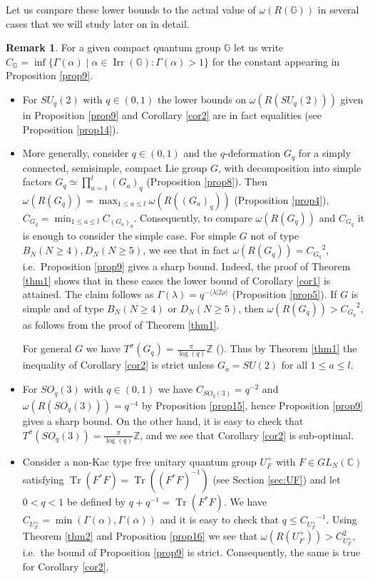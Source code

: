 \documentclass[11 pt, leqno]{amsart}
\newcommand{\ov}{\overline}
\newcommand{\la}{\langle}
\newcommand{\ra}{\rangle}
\newcommand{\CC}{\mathbb{C}}
\newcommand{\ZZ}{\mathbb{Z}}
\newcommand{\GG}{\mathbb{G}}
\DeclareMathOperator{\Irr}{Irr}
\DeclareMathOperator{\Tr}{Tr}
\theoremstyle{definition}
\newtheorem{remark}[theorem]{Remark}
\numberwithin{equation}{section}
\begin{document}
Let us compare these lower bounds to the actual value of $\omega(R(\GG))$ in several cases that we will study later on in detail.

\begin{remark}\label{rem3}
For a given compact quantum group $\GG$ let us write $C_{\GG}=\inf\{\Gamma(\alpha)\mid \alpha\in\Irr(\GG)\colon \Gamma(\alpha)>1\}$ for the constant appearing in Proposition \ref{prop9}.
\begin{itemize}
\item[(i)] For $SU_q(2)$ with $q\in (0,1)$ the lower bounds on $\omega(R(SU_q(2)))$ given in Proposition \ref{prop9} and Corollary \ref{cor2} are in fact equalities (see Proposition \ref{prop14}).
\item[(ii)] More generally, consider $q \in (0,1)$ and the $q$-deformation $G_q$ for a simply connected, semisimple, compact Lie group $G$, with decomposition into simple factors $G_q\simeq\prod_{a=1}^{l} (G_a)_q$ (Proposition \ref{prop8}). Then $\omega(R(G_q))=\max_{1\le a \le l} \omega(R((G_a)_q))$ (Proposition \ref{prop4}), $C_{G_q}=\min_{1\le a \le l} C_{(G_a)_q}$. Consequently, to compare $\omega(R(G_q))$ and $C_{G_q}$ it is enough to consider the simple case. For simple $G$ not of type $B_N(N\ge 4),D_N(N\ge 5)$, we see that in fact $\omega(R(G_q))={C_{G_q}}^2$, i.e.~Proposition \ref{prop9} gives a sharp bound. Indeed, the proof of Theorem \ref{thm1} shows that in these cases the lower bound of Corollary \ref{cor1} is attained. The claim follows as $\Gamma(\lambda)=q^{-\la \lambda |2\rho\ra }$ (Proposition \ref{prop5}). If $G$ is simple and of type $B_N (N\ge 4)$ or $D_N (N\ge 5)$, then $\omega(R(G_q))> {C_{G_q}}^2$, as follows from the proof of Theorem \ref{thm1}.

For general $G$ we have $T^\sigma(G_q)=\tfrac{\pi}{\log(q)}\ZZ$ (\cite[Proposition 2.3, Theorem 4.12]{KrajczokSoltan}). Thus by Theorem \ref{thm1} the inequality of Corollary \ref{cor2} is strict unless $G_a=SU(2)$ for all $1\le a \le l$.
\item[(iii)] For $SO_q(3)$ with $q \in (0,1)$ we have $C_{SO_q(3)}=q^{-2}$ and $\omega(R(SO_q(3) ))=q^{-4}$ by Proposition \ref{prop15}, hence Proposition \ref{prop9} gives a sharp bound. On the other hand, it is easy to check that $T^\sigma(SO_q(3))=\tfrac{\pi}{\log(q)}\ZZ$, and we see that Corollary \ref{cor2} is sub-optimal. 
\item[(iv)] Consider a non-Kac type free unitary quantum group $U_F^+$ with $F\in GL_N(\CC)$ satisfying $\Tr(F^*F)=\Tr((F^*F)^{-1})$ (see Section \ref{sec:UF}) and let $0<q<1$ be defined by $q+q^{-1}=\Tr(F^*F)$. We have $C_{U_F^+}=\min( \Gamma(\alpha),\Gamma(\ov\alpha) )$ \cite[Lemma 3.8]{KrajczokSoltan} and it is easy to check that $q \le {C_{U_F^+}}^{-1}$. Using Theorem \ref{thm2} and Proposition \ref{prop16} we see that $\omega(R(U_F^+)) > C_{U_F^+}^2$, i.e.~the bound of Proposition \ref{prop9} is strict. Consequently, the same is true for Corollary \ref{cor2}.
\end{itemize}
\end{remark}
\end{document}
